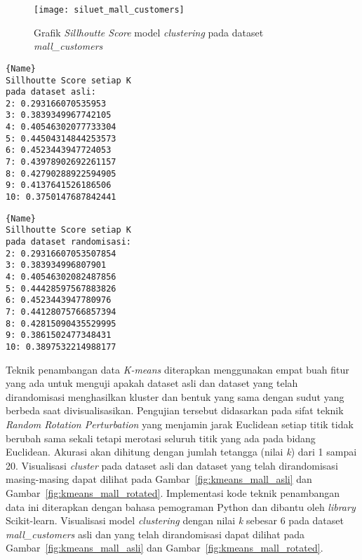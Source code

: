 \begin{figure}
	\centering
	\texttt{[image: siluet\_mall\_customers]}
	\caption{Grafik \textit{Sillhoutte Score} model \textit{clustering} pada dataset \textit{mall\_customers}}
	\label{fig:siluet_mall_customers}
\end{figure}

\noindent\begin{minipage}{.48\textwidth}
\begin{lstlisting}[caption=Sillhoutte Score Dataset Asli,frame=tlrb, label=mall_customers_siluet_asli]{Name}
Sillhoutte Score setiap K
pada dataset asli: 
2: 0.293166070535953
3: 0.3839349967742105
4: 0.40546302077733304
5: 0.44504314844253573
6: 0.4523443947724053
7: 0.43978902692261157
8: 0.42790288922594905
9: 0.4137641526186506
10: 0.3750147687842441
\end{lstlisting}
\end{minipage}\hfill
\begin{minipage}{.48\textwidth}
\begin{lstlisting}[caption=Sillhoutte Score Dataset Randomisasi,frame=tlrb, label=mall_customers_siluet_randomisasi]{Name}
Sillhoutte Score setiap K
pada dataset randomisasi: 
2: 0.29316607053507854
3: 0.383934996807901
4: 0.40546302082487856
5: 0.44428597567883826
6: 0.4523443947780976
7: 0.44128075766857394
8: 0.42815090435529995
9: 0.3861502477348431
10: 0.3897532214988177
\end{lstlisting}
\end{minipage}

Teknik penambangan data \textit{K-means} diterapkan menggunakan empat buah fitur yang ada untuk menguji apakah dataset asli dan dataset yang telah dirandomisasi menghasilkan kluster dan bentuk yang sama dengan sudut yang berbeda saat divisualisasikan. Pengujian tersebut didasarkan pada sifat teknik \textit{Random Rotation Perturbation} yang menjamin jarak Euclidean setiap titik tidak berubah sama sekali tetapi merotasi seluruh titik yang ada pada bidang Euclidean. Akurasi akan dihitung dengan jumlah tetangga (nilai \textit{k}) dari 1 sampai 20. Visualisasi \textit{cluster} pada dataset asli dan dataset yang telah dirandomisasi masing-masing dapat dilihat pada Gambar~\ref{fig:kmeans_mall_asli} dan Gambar~\ref{fig:kmeans_mall_rotated}. Implementasi kode teknik penambangan data ini diterapkan dengan bahasa pemograman Python dan dibantu oleh \textit{library} Scikit-learn. Visualisasi model \textit{clustering} dengan nilai \textit{k} sebesar 6 pada dataset \textit{mall\_customers} asli dan yang telah dirandomisasi dapat dilihat pada Gambar~\ref{fig:kmeans_mall_asli} dan Gambar~\ref{fig:kmeans_mall_rotated}. 

